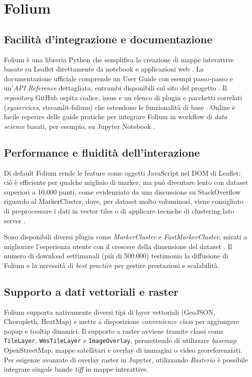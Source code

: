 \section{Folium}
\label{ch:folium}

\subsection{Facilità d'integrazione e documentazione}
Folium è una libreria Python che semplifica la creazione di mappe interattive basate
su Leaflet direttamente da notebook e applicazioni web \cite{folium-doc}. La
documentazione ufficiale comprende un User Guide con esempi passo‑passo e un'\textit{API
Reference} dettagliata, entrambi disponibili sul sito del progetto
\cite{folium-userguide}. Il \textit{repository} GitHub ospita codice, issue e un
elenco di plugin e pacchetti correlati (\textit{xyzservices}, streamlit‑folium) che
estendono le funzionalità di base \cite{folium-github,folium-pypistats}. Online
è facile reperire delle guide pratiche per integrare Folium in workflow di
\textit{data science} basati, per esempio, su Jupyter Notebook \cite{folium-tutorial,folium-realpython}.

\subsection{Performance e fluidità dell'interazione}
Di default Folium rende le feature come oggetti JavaScript nel DOM di Leaflet:
ciò è efficiente per qualche migliaio di marker, ma può diventare lento con dataset
superiori a 10.000 punti, come evidenziato da una discussione su StackOverflow
riguardo al MarkerCluster, dove, per dataset molto voluminosi, viene consigliato
di preprocessare i dati in vector tiles o di applicare tecniche di clustering lato
server \cite{folium-cluster-issue}.

Sono disponibili diversi plugin come \textit{MarkerCluster} e \textit{FastMarkerCluster},
mirati a migliorare l'esperienza utente con il crescere della dimensione del
dataset \cite{folium-cluster-issue,folium-pypistats}. Il numero di download settimanali
(più di 500.000) testimonia la diffusione di Folium e la necessità di \textit{best
practice} per gestire prestazioni e scalabilità.

\subsection{Supporto a dati vettoriali e raster}
Folium supporta nativamente diversi tipi di layer vettoriali (GeoJSON,
Choropleth, HeatMap) e mette a disposizione \textit{convenience class} per aggiungere
popup e tooltip dinamici. Il supporto a raster avviene tramite classi come
\texttt{TileLayer}, \texttt{WmsTileLayer} e \texttt{ImageOverlay}, permettendo di
utilizzare \textit{basemap} OpenStreetMap, mappe satellitari e overlay di immagini
o video georeferenziati. Per esigenze avanzate di overlay raster in Jupyter, utilizzando
\textit{Rasterio} è possibile integrare singole bande \textit{tiff} in mappe interattive.
\cite{folium-raster,folium-tutorial, folium-doc}

